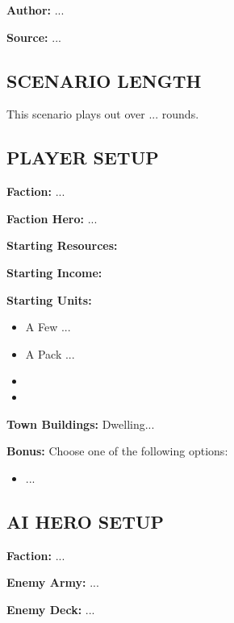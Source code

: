 
\begin{multicols*}{2}

\textbf{Author:} ...

\textbf{Source:} ...

\subsection*{\MakeUppercase{Scenario length}}

This scenario plays out over ... rounds.

\subsection*{\MakeUppercase{Player setup}}

\textbf{Faction:} ...

\textbf{Faction Hero:} ...

\textbf{Starting Resources:}\par
{}

\textbf{Starting Income:}\par
{}

\textbf{Starting Units:}
\begin{itemize}
  \item A Few ...
  \item A Pack ...
  \item {}
  \item {}
\end{itemize}

\textbf{Town Buildings:}  Dwelling...

\textbf{Bonus:} Choose one of the following options:
\begin{itemize}
    \item ...
\end{itemize}

\subsection*{\MakeUppercase{AI hero setup}}

\textbf{Faction:} ...

\textbf{Enemy Army:} ...

\textbf{Enemy Deck:} ...


\end{multicols*}

